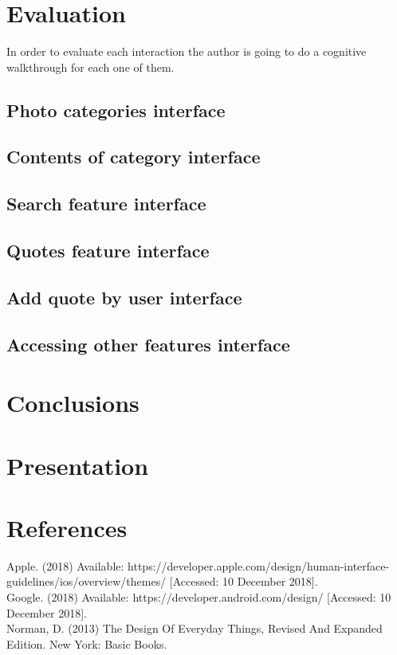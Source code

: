 \documentclass[version=last,fontsize=13pt]{scrartcl}
\begin{document}
\section{Evaluation}
	 In order to evaluate each interaction the author is going to do a cognitive walkthrough for each one of them.

\subsection{Photo categories interface}

\subsection{Contents of category interface}

\subsection{Search feature interface}

\subsection{Quotes feature interface}

\subsection{Add quote by user interface}

\subsection{Accessing other features interface}

\section{Conclusions}

\section{Presentation}

\section{References}
Apple. (2018) Available: https://developer.apple.com/design/human-interface-guidelines/ios/overview/themes/ [Accessed: 10 December 2018].\\

Google. (2018) Available: https://developer.android.com/design/ [Accessed: 10 December 2018]. \\

Norman, D. (2013) The Design Of Everyday Things, Revised And Expanded Edition. New York: Basic Books.\\
\end{document}
